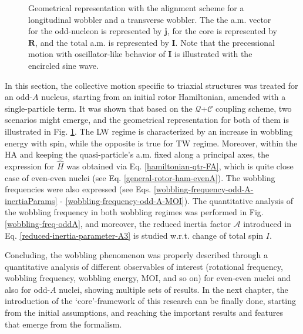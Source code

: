 \begin{figure}
    \caption{Geometrical representation with the alignment scheme for a longitudinal wobbler and a transverse wobbler. The the a.m. vector for the odd-nucleon is represented by $\mathbf{j}$, for the core is represented by $\mathbf{R}$, and the total a.m. is represented by $\mathbf{I}$. Note that the precessional motion with oscillator-like behavior of $\mathbf{I}$ is illustrated with the encircled sine wave.}
    \label{wobbling-oddA-geometry}
\end{figure}

In this section, the collective motion specific to triaxial structures was treated for an odd-$A$ nucleus, starting from an initial rotor Hamiltonian, amended with a single-particle term. It was shown that based on the $\mathcal{Q}$+$\mathscr{C}$ coupling scheme, two scenarios might emerge, and the geometrical representation for both of them is illustrated in Fig. \ref{wobbling-oddA-geometry}. The LW regime is characterized by an increase in wobbling energy with spin, while the opposite is true for TW regime. Moreover, within the HA and keeping the quasi-particle's a.m. fixed along a principal axes, the expression for $\hat{H}$ was obtained via Eq. \ref{hamiltonian-qtr-FA}, which is quite close case of even-even nuclei (see Eq. \ref{general-rotor-ham-evenA}). The wobbling frequencies were also expressed (see Eqs. \ref{wobbling-frequency-odd-A-inertiaParams} - \ref{wobbling-frequency-odd-A-MOI}). The quantitative analysis of the wobbling frequency in both wobbling regimes was performed in Fig. \ref{wobbling-freq-oddA}, and moreover, the reduced inertia factor $\mathscr{A}$ introduced in Eq. \ref{reduced-inertia-parameter-A3} is studied w.r.t. change of total spin $I$.

Concluding, the wobbling phenomenon was properly described through a quantitative analysis of different observables of interest (rotational frequency, wobbling frequency, wobbling energy, MOI, and so on) for even-even nuclei and also for odd-$A$ nuclei, showing multiple sets of results. In the next chapter, the introduction of the `core'-framework of this research can be finally done, starting from the initial assumptions, and reaching the important results and features that emerge from the formalism.

